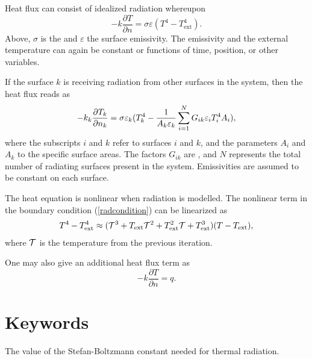 Heat flux can consist of idealized radiation whereupon
\begin{equation}
-k\frac{\partial T}{\partial n} =\sigma\varepsilon (T^4 -T^4_\mathrm{ext} ).
\label{radcondition}
\end{equation}
Above,  $\sigma$ is the  and $\varepsilon$ the 
surface emissivity. The emissivity and the external temperature can 
again be constant or functions of time, position, or other variables.

If the surface $k$ is receiving radiation from other surfaces in the system,
then the heat flux reads as
\begin{equation}
-k_k \frac{\partial T_k}{\partial n_k} = \sigma \varepsilon_k (T_k^4 -
{1\over {A_k \varepsilon_k}} \sum_{i=1}^N G_{ik} \varepsilon_i  T_i^4 A_i ),
\end{equation}
where the subscripts $i$ and $k$ refer to surfaces $i$ and $k$, and the parameters $A_i$ and
$A_k$ to the specific surface areas. The factors $G_{ik}$ are , and
$N$ represents the total number of radiating surfaces present in the system.
Emissivities are assumed to be constant on each surface.

The heat equation is nonlinear when radiation is modelled.
The nonlinear term in the boundary condition (\ref{radcondition})
can be linearized as
\begin{eqnarray}
T^4 - T^4_\mathrm{ext} \approx
( {\cal T}^3 + T_\mathrm{ext} {\cal T}^2  + T^2_\mathrm{ext} {\cal T} + 
T^3_\mathrm{ext} )( T-T_\mathrm{ext} ),
\end{eqnarray}
where $\cal{T}$ is the temperature from the previous iteration.

One may also give an additional heat flux term as
\begin{equation}
-k\frac{\partial T}{\partial n} = q.
\end{equation}

\section{Keywords} 

\sifbegin
{}
\sifbegin
{}
The value of the Stefan-Boltzmann constant needed for 
thermal radiation.
\sifend


